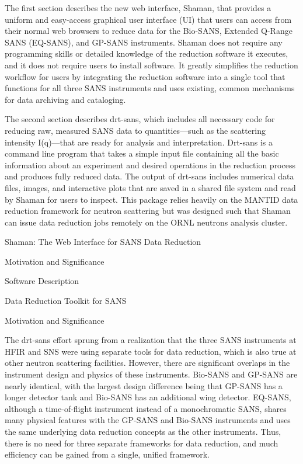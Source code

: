 The first section describes the new web interface, Shaman, that provides a uniform and easy-access
graphical user interface (UI) that users can access from their normal web browsers to reduce data
for the Bio-SANS, Extended Q-Range SANS (EQ-SANS), and GP-SANS instruments. Shaman does not require
any programming skills or detailed knowledge of the reduction software it executes, and it does not
require users to install software. It greatly simplifies the reduction workflow for users by
integrating the reduction software into a single tool that functions for all three SANS instruments
and uses existing, common mechanisms for data archiving and cataloging.

The second section describes drt-sans, which includes all necessary code for reducing raw, measured
SANS data to quantities—such as the scattering intensity I(q)—that are ready for analysis and
interpretation. Drt-sans is a command line program that takes a simple input file containing all the
basic information about an experiment and desired operations in the reduction process and produces
fully reduced data. The output of drt-sans includes numerical data files, images, and interactive
plots that are saved in a shared file system and read by Shaman for users to inspect. This package
relies heavily on the MANTID data reduction framework for neutron scattering but was designed such
that Shaman can issue data reduction jobs remotely on the ORNL neutrons analysis cluster.

Shaman: The Web Interface for SANS Data Reduction

Motivation and Significance



Software Description


Data Reduction Toolkit for SANS

Motivation and Significance

The drt-sans effort sprung from a realization that the three SANS instruments at HFIR and SNS were
using separate tools for data reduction, which is also true at other neutron scattering facilities.
However, there are significant overlaps in the instrument design and physics of these instruments.
Bio-SANS and GP-SANS are nearly identical, with the largest design difference being that GP-SANS has
a longer detector tank and Bio-SANS has an additional wing detector. EQ-SANS, although a
time-of-flight instrument instead of a monochromatic SANS, shares many physical features with the
GP-SANS and Bio-SANS instruments and uses the same underlying data reduction concepts as the other
instruments. Thus, there is no need for three separate frameworks for data reduction, and much
efficiency can be gained from a single, unified framework.

